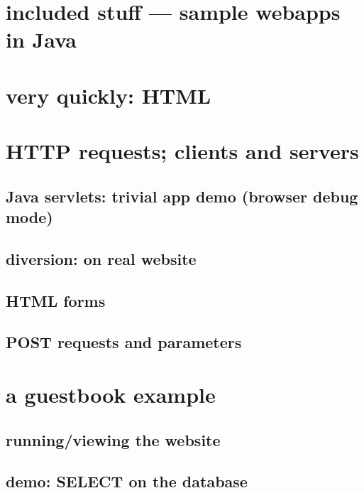 \newcommand{\nred}[1]{{\color{red!60!black}\bfseries #1}}
\newcommand{\nblack}[1]{\textbf{#1}}


\begin{frame}
    \titlepage
\end{frame}

\section{included stuff --- sample webapps in Java}

\section{very quickly: HTML}

\section{HTTP requests; clients and servers}

\subsection{Java servlets: trivial app demo (browser debug mode)}

\subsection{diversion: on real website}

\subsection{HTML forms}

\subsection{POST requests and parameters}

\section{a guestbook example}

\subsection{running/viewing the website}

\subsection{demo: SELECT on the database}

